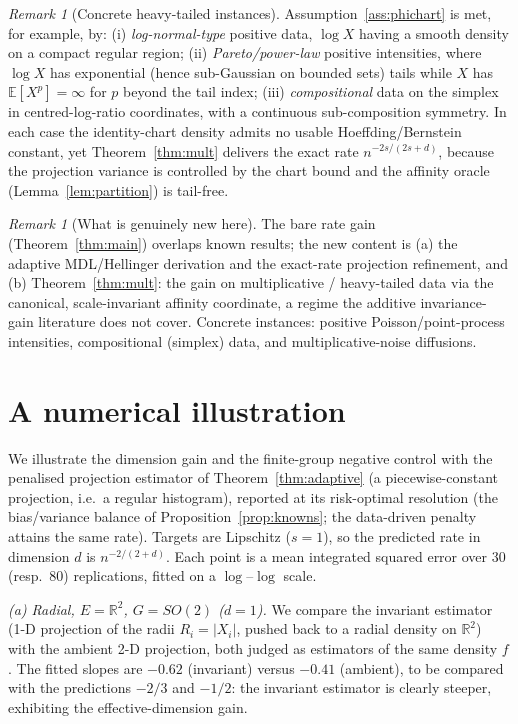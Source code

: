 \documentclass[11pt]{article}
\theoremstyle{plain}
\theoremstyle{definition}
\theoremstyle{remark}
\newtheorem{remark}[theorem]{Remark}
\newcommand{\R}{\mathbb{R}}
\newcommand{\E}{\mathbb{E}}
\begin{document}
\begin{remark}[Concrete heavy-tailed instances]\label{rem:heavyinstances}
Assumption~\ref{ass:phichart} is met, for example, by: (i) \emph{log-normal-type}
positive data, $\log X$ having a smooth density on a compact regular region;
(ii) \emph{Pareto/power-law} positive intensities, where $\log X$ has exponential
(hence sub-Gaussian on bounded sets) tails while $X$ has $\E[X^p]=\infty$ for $p$
beyond the tail index; (iii) \emph{compositional} data on the simplex in
centred-log-ratio coordinates, with a continuous sub-composition symmetry. In each
case the identity-chart density admits no usable Hoeffding/Bernstein constant, yet
Theorem~\ref{thm:mult} delivers the exact rate $n^{-2s/(2s+d)}$, because the
projection variance is controlled by the chart bound and the affinity oracle
(Lemma~\ref{lem:partition}) is tail-free.
\end{remark}

\begin{remark}[What is genuinely new here]
The bare rate gain (Theorem~\ref{thm:main}) overlaps known results; the new content
is (a) the adaptive MDL/Hellinger derivation and the exact-rate projection
refinement, and (b) Theorem~\ref{thm:mult}: the gain on multiplicative /
heavy-tailed data via the canonical, scale-invariant affinity coordinate, a regime
the additive invariance-gain literature does not cover. Concrete instances: positive
Poisson/point-process intensities, compositional (simplex) data, and
multiplicative-noise diffusions.
\end{remark}

\section{A numerical illustration}\label{sec:sim}

We illustrate the dimension gain and the finite-group negative control with the
penalised projection estimator of Theorem~\ref{thm:adaptive} (a piecewise-constant
projection, i.e.\ a regular histogram), reported at its risk-optimal resolution
(the bias/variance balance of Proposition~\ref{prop:knowns}; the data-driven
penalty attains the same rate). Targets are Lipschitz ($s=1$), so the predicted
rate in dimension $d$ is $n^{-2/(2+d)}$. Each point is a mean integrated squared
error over $30$ (resp.\ $80$) replications, fitted on a $\log$--$\log$ scale.

\emph{(a) Radial, $E=\R^2$, $G=SO(2)$ ($d=1$).} We compare the invariant estimator
(1-D projection of the radii $R_i=|X_i|$, pushed back to a radial density on $\R^2$)
with the ambient 2-D projection, both judged as estimators of the same density $f$.
The fitted slopes are $-0.62$ (invariant) versus $-0.41$ (ambient), to be compared
with the predictions $-2/3$ and $-1/2$: the invariant estimator is clearly steeper,
exhibiting the effective-dimension gain.
\end{document}
